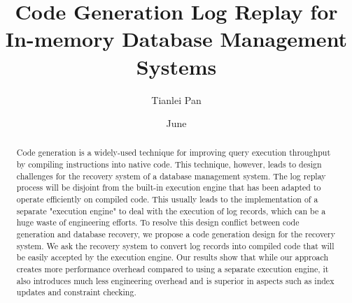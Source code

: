 \documentclass[12pt]{cmuthesis}
\begin{document}
 
\frontmatter

\pagestyle{empty}

\title{ %
{\bf Code Generation Log Replay for In-memory Database Management Systems}}
\author{Tianlei Pan}
\date{June}
\trnumber{}


\support{}
\disclaimer{}



\maketitle

\begin{dedication}
\end{dedication}

\pagestyle{plain} %


\begin{abstract}
Code generation is a widely-used technique for improving query execution throughput by compiling instructions into native code. This technique, however, leads to design challenges for the recovery system of a database management system. The log replay process will be disjoint from the built-in execution engine that has been adapted to operate efficiently on compiled code. This usually leads to the implementation of a separate "execution engine" to deal with the execution of log records, which can be a huge waste of engineering efforts. To resolve this design conflict between code generation and database recovery, we propose a code generation design for the recovery system. We ask the recovery system to convert log records into compiled code that will be easily accepted by the execution engine. Our results show that while our approach creates more performance overhead compared to using a separate execution engine, it also introduces much less engineering overhead and is superior in aspects such as index updates and constraint checking.
\end{abstract}
\end{document}
